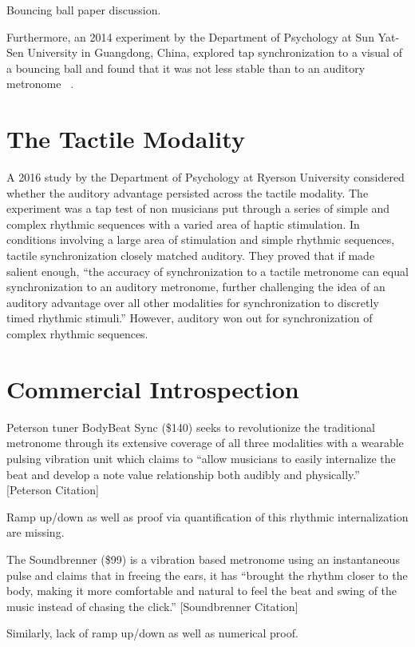 Bouncing ball paper discussion.

Furthermore, an 2014 experiment by the Department of Psychology at Sun Yat-Sen University in Guangdong, China, explored tap synchronization to a visual of a bouncing ball and found that it was not less stable than to an auditory metronome ~\cite{gan2015synchronization}.


\section{The Tactile Modality}
A 2016 study by the Department of Psychology at Ryerson University considered whether the auditory advantage persisted across the tactile modality. The experiment was a tap test of non musicians put through a series of simple and complex rhythmic sequences with a varied area of haptic stimulation. In conditions involving a large area of stimulation and simple rhythmic sequences, tactile synchronization closely matched auditory. They proved that if made salient enough, “the accuracy of synchronization to a tactile metronome can equal synchronization to an auditory metronome, further challenging the idea of an auditory advantage over all other modalities for synchronization to discretly timed rhythmic stimuli.” However, auditory won out for synchronization of complex rhythmic sequences. ~\cite{ammirante2016synchronizing}

\section{Commercial Introspection}
Peterson tuner BodyBeat Sync (\$140) seeks to revolutionize the traditional metronome through its extensive coverage of all three modalities with a wearable pulsing vibration unit which claims to “allow musicians to easily internalize the beat and develop a note value relationship both audibly and physically.” [Peterson Citation]

Ramp up/down as well as proof via quantification of this rhythmic internalization are missing.

The Soundbrenner (\$99) is a vibration based metronome using an instantaneous pulse and claims that in freeing the ears, it has “brought the rhythm closer to the body, making it more comfortable and natural to feel the beat and swing of the music instead of chasing the click.” [Soundbrenner Citation]

Similarly, lack of ramp up/down as well as numerical proof.
